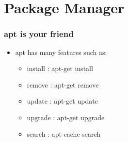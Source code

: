 \section{Package Manager}
\begin{frame}
    \frametitle{apt is your friend}
    \begin{itemize}
        \item apt has many features such as:
        \begin{itemize}
            \item install : apt-get install
            \item remove : apt-get remove
            \item update : apt-get update
            \item upgrade : apt-get upgrade
            \item search : apt-cache search
        \end{itemize}
    \end{itemize}
\end{frame}
